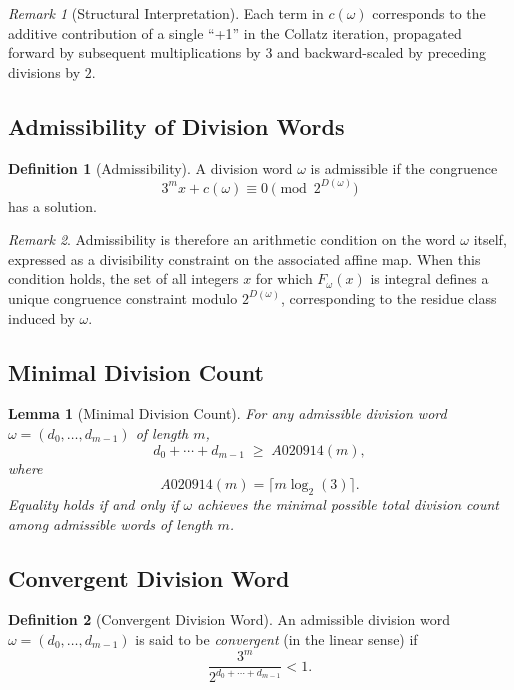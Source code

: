 \documentclass[12pt, oneside]{article}
\numberwithin{equation}{section}
\theoremstyle{definition}
\newtheorem{definition}{Definition}[section]
\theoremstyle{plain}
\newtheorem{lemma}[theorem]{Lemma}
\theoremstyle{remark}
\newtheorem*{remark}{Remark}
\begin{document}
\begin{remark}[Structural Interpretation]
Each term in $c(\omega)$ corresponds to the additive contribution of a single
``+1'' in the Collatz iteration, propagated forward by subsequent multiplications
by $3$ and backward-scaled by preceding divisions by $2$.
\end{remark}

\subsection{Admissibility of Division Words}

\begin{definition}[Admissibility]
\label{def:admissible-division-word}
A division word $\omega$ is admissible if the congruence
\[
3^m x + c(\omega) \equiv 0 \pmod{2^{D(\omega)}}
\]
has a solution.
\end{definition}
\begin{remark}
Admissibility is therefore an arithmetic condition on the word $\omega$
itself, expressed as a divisibility constraint on the associated affine
map. When this condition holds, the set of all integers $x$ for which
$F_\omega(x)$ is integral defines a unique congruence constraint modulo
$2^{D(\omega)}$, corresponding to the residue class induced by $\omega$.
\end{remark}

\subsection{Minimal Division Count}

\begin{lemma}[Minimal Division Count]
For any admissible division word $\omega=(d_0,\dots,d_{m-1})$ of length $m$,
\[
d_0 + \cdots + d_{m-1} \;\ge\; A020914(m),
\]
where
\[
A020914(m) = \lceil m \log_2(3) \rceil.
\]
Equality holds if and only if $\omega$ achieves the minimal possible total
division count among admissible words of length $m$.
\end{lemma}

\subsection{Convergent Division Word}

\begin{definition}[Convergent Division Word]
An admissible division word $\omega = (d_0,\dots,d_{m-1})$ is said to be
\emph{convergent} (in the linear sense) if
\[
\frac{3^m}{2^{d_0+\cdots+d_{m-1}}} < 1.
\]
\end{definition}
\end{document}
